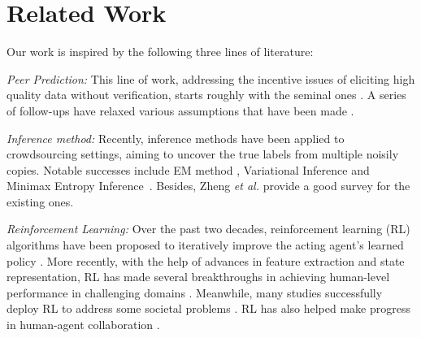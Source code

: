 \section{Related Work}
\label{section: related work}
Our work is inspired by the following three lines of literature:

\emph{Peer Prediction:} This line of work, addressing the incentive issues of eliciting high quality data without verification, starts roughly with the seminal ones \cite{prelec2004bayesian,gneiting2007strictly}. A series of follow-ups have relaxed various assumptions that have been made \cite{jurca2009mechanisms,witkowski2012peer,radanovic2013robust,dasgupta2013crowdsourced}. 

\emph{Inference method:} Recently, inference methods have been applied to crowdsourcing settings, aiming to uncover the true labels from multiple noisily copies. Notable successes include EM method \cite{dawid1979maximum,raykar2010learning,zhang2014spectral}, Variational Inference \cite{liu2012variational,chen2015statistical} and Minimax Entropy Inference~\cite{zhou2012learning,zhou2014aggregating}. Besides, Zheng \textit{et al.} \cite{zheng2017truth} provide a good survey for the existing ones.

\emph{Reinforcement Learning:} Over the past two decades, reinforcement learning (RL) algorithms have been proposed to iteratively improve the acting agent's learned policy \citep{Watkins92, Tesauro95, Sutton98, Gordon00, Szepesvari10}. More recently, with the help of advances in feature extraction and state representation, RL has made several breakthroughs in achieving human-level performance in challenging domains \citep{Mnih15,Liang16, Hasselt2016DeepRL, Silver17}. Meanwhile, many studies successfully deploy RL to address some societal problems \citep{Yu2013EmotionalMR,Leibo2017}. RL has also helped make progress in human-agent collaboration \citep{engel2005reinforcement, gasic2014gaussian,Sadhu2016ArgusSH,Wang2017}.


